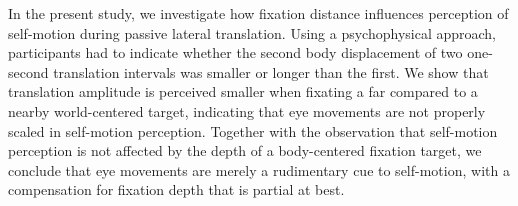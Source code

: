 In the present study, we investigate how fixation distance influences perception of self-motion during passive lateral translation. Using a psychophysical approach, participants had to indicate whether the second body displacement of two one-second translation intervals was smaller or longer than the first. We show that translation amplitude is perceived smaller when fixating a far compared to a nearby world-centered target, indicating that eye movements are not properly scaled in self-motion perception. Together with the observation that self-motion perception is not affected by the depth of a body-centered fixation target, we conclude that eye movements are merely a rudimentary cue to self-motion, with a compensation for fixation depth that is partial at best.
